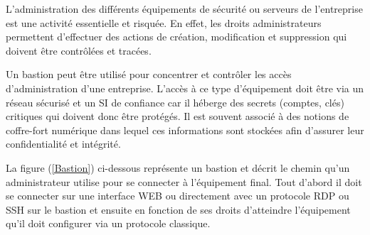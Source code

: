 L'administration des différents équipements de sécurité ou serveurs de l'entreprise est une activité essentielle et risquée. En effet, les droits administrateurs permettent d'effectuer des actions de création, modification et suppression qui doivent être contrôlées et tracées.

Un bastion peut être utilisé pour concentrer et contrôler les accès d'administration d'une entreprise. L'accès à ce type d'équipement doit être via un réseau sécurisé et un SI de confiance car il héberge des secrets (comptes, clés) critiques qui doivent donc être protégés. Il est souvent associé à des notions de coffre-fort numérique dans lequel ces informations sont stockées afin d'assurer leur confidentialité et intégrité.

La figure (\ref{Bastion}) ci-dessous représente un bastion et décrit le chemin qu'un administrateur utilise pour se connecter à l'équipement final. Tout d'abord il doit se connecter sur une interface WEB ou directement avec un protocole RDP ou SSH sur le bastion et ensuite en fonction de ses droits d'atteindre l'équipement qu'il doit configurer via un protocole classique.





